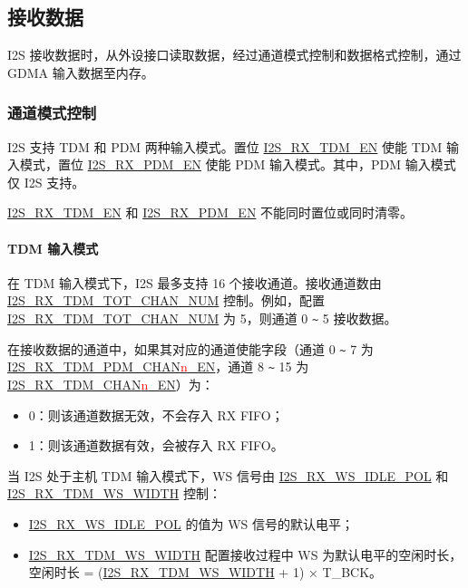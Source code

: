 \documentclass[main\_\_CN.tex]{subfiles}
\begin{document}
\subsection{接收数据}\label{sec:i2s-rx-data}

I2S 接收数据时，从外设接口读取数据，经过通道模式控制和数据格式控制，通过 GDMA 输入数据至内存。

\subsubsection{通道模式控制}

\chipname{} I2S 支持 TDM 和 PDM 两种输入模式。置位 \hyperref[fielddesc:I2SRXTDMEN]{I2S\_RX\_TDM\_EN} 使能 TDM 输入模式，置位 \hyperref[fielddesc:I2SRXPDMEN]{I2S\_RX\_PDM\_EN} 使能 PDM 输入模式。其中，PDM 输入模式仅 I2S 支持。

\begin{tiplisting}
\hyperref[fielddesc:I2SRXTDMEN]{I2S\_RX\_TDM\_EN} 和 \hyperref[fielddesc:I2SRXPDMEN]{I2S\_RX\_PDM\_EN} 不能同时置位或同时清零。
\end{tiplisting}
\vspace{-1em}

\paragraph{TDM 输入模式}

在 TDM 输入模式下，I2S 最多支持 16 个接收通道。接收通道数由 \hyperref[fielddesc:I2SRXTDMTOTCHANNUM]{I2S\_RX\_TDM\_TOT\_CHAN\_NUM} 控制。例如，配置 \hyperref[fielddesc:I2SRXTDMTOTCHANNUM]{I2S\_RX\_TDM\_TOT\_CHAN\_NUM} 为 5，则通道 0 \verb+~+ 5 接收数据。

在接收数据的通道中，如果其对应的通道使能字段（通道 0 \verb+~+ 7 为 \hyperref[fielddesc:I2SRXTDMPDMCHAN0EN]{I2S\_RX\_TDM\_PDM\_CHAN{\textcolor{red}{n}}\_EN}，通道 8 \verb+~+ 15 为 \hyperref[fielddesc:I2SRXTDMCHAN8EN]{I2S\_RX\_TDM\_CHAN{\textcolor{red}{n}}\_EN}）为：
\begin{itemize}
    \item 0：则该通道数据无效，不会存入 RX FIFO；
    \item 1：则该通道数据有效，会被存入 RX FIFO。
\end{itemize}
当 I2S 处于主机 TDM 输入模式下，WS 信号由 \hyperref[fielddesc:I2SRXWSIDLEPOL]{I2S\_RX\_WS\_IDLE\_POL} 和 \hyperref[fielddesc:I2SRXTDMWSWIDTH]{I2S\_RX\_TDM\_WS\_WIDTH} 控制：
\begin{itemize}
    \item \hyperref[fielddesc:I2SRXWSIDLEPOL]{I2S\_RX\_WS\_IDLE\_POL} 的值为 WS 信号的默认电平；
    \item \hyperref[fielddesc:I2SRXTDMWSWIDTH]{I2S\_RX\_TDM\_WS\_WIDTH} 配置接收过程中 WS 为默认电平的空闲时长，空闲时长 = (\hyperref[fielddesc:I2SRXTDMWSWIDTH]{I2S\_RX\_TDM\_WS\_WIDTH} + 1) × T\_BCK。
\end{itemize}
\end{document}
